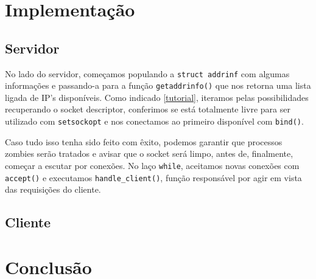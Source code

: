 \documentclass[11pt]{article}
\theoremstyle{definition}
\theoremstyle{definition}
\theoremstyle{remark}
\theoremstyle{remark}
\theoremstyle{remark}
\theoremstyle{remark}
\theoremstyle{definition}
\begin{document}
\section{Implementação}
\label{sec:org4385817}
\subsection{Servidor}
\label{sec:orgeaee4e9}
No lado do servidor, começamos populando a \texttt{struct addrinf} com algumas informações e passando-a para a função \texttt{getaddrinfo()} que nos retorna uma lista ligada de IP's disponíveis. Como indicado \ref{tutorial}, iteramos pelas possibilidades recuperando o socket descriptor, conferimos se está totalmente livre para ser utilizado com \texttt{setsockopt} e nos conectamos ao primeiro disponível com \texttt{bind()}.

Caso tudo isso tenha sido feito com êxito, podemos garantir que processos zombies serão tratados e avisar que o socket será limpo, antes de, finalmente, começar a escutar por conexões. No laço \texttt{while}, aceitamos novas conexões com \texttt{accept()} e executamos \texttt{handle\_client()}, função responsável por agir em vista das requisições do cliente.
\subsection{Cliente}
\label{sec:orgd62d940}
\section{Conclusão}
\label{sec:org2124d37}
\end{document}
